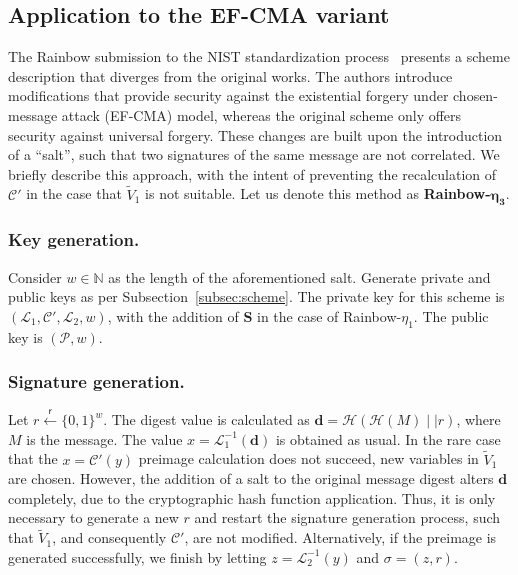 \documentclass[draft, 12pt, a4paper, oneside]{memoir}
\newcommand{\random}{\overset{\mathsf{r}}{\gets}}
\theoremstyle{definition}
\begin{document}
\subsection{Application to the EF-CMA variant}\label{subsec:efcma}

The Rainbow submission to the NIST standardization
process~\cite{Ding:201712} presents a scheme description that diverges
from the original works. The authors introduce modifications that provide
security against the existential forgery under chosen-message attack (EF-CMA)
model, whereas the original scheme only offers security against universal
forgery. These changes are built upon the introduction of a ``salt'', such that two signatures of the same message are not correlated. We
briefly describe this approach, with the intent of preventing the
recalculation of $\mathcal{C}'$ in the case that $\widetilde{V}_{1}$ is not
suitable. Let us denote this method as \textbf{Rainbow-}$\mathbf{\eta_{3}}$.

\subsubsection{Key generation.}

Consider $w \in \mathbb{N}$ as the length of the aforementioned salt. Generate
private and public keys as per Subsection~\ref{subsec:scheme}. The private key
for this scheme is $(\mathcal{L}_{1}, \mathcal{C}', \mathcal{L}_{2}, w)$, with the
addition of $\mathbf{S}$ in the case of Rainbow-$\eta_{1}$. The public key is
$(\mathcal{P}, w)$.

\subsubsection{Signature generation.}

Let $r \random {\{0, 1\}}^{w}$. The digest value is calculated as
$\mathbf{d} = \mathcal{H}(\mathcal{H}(M) \mid\mid r)$, where $M$ is the
message. The value $x = \mathcal{L}_{1}^{-1}(\mathbf{d})$ is obtained as usual. In
the rare case that the $x = \mathcal{C}'(y)$ preimage calculation does not
succeed, new variables in $\widetilde{V}_{1}$ are chosen. However, the
addition of a salt to the original message digest alters $\mathbf{d}$
completely, due to the cryptographic hash function application. Thus, it is
only necessary to generate a new $r$ and restart the signature generation
process, such that $\widetilde{V}_{1}$, and consequently $\mathcal{C}'$, are
not modified. Alternatively, if the preimage is generated successfully, we
finish by letting $z = \mathcal{L}_{2}^{-1}(y)$ and $\sigma = (z, r)$.
\end{document}
